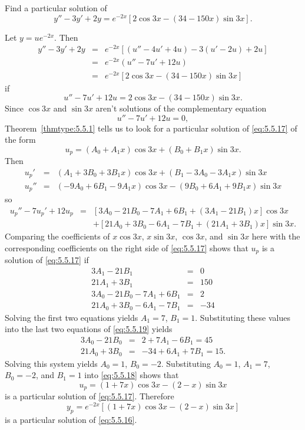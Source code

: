 \documentclass{ximera}
\begin{document}
\begin{example}\label{example:5.5.5}
Find a particular solution of
\begin{equation} \label{eq:5.5.16}
y''-3y'+2y=e^{-2x}\left[2\cos 3x-(34-150x)\sin 3x\right].
\end{equation}


\begin{explanation}
Let $y=ue^{-2x}$. Then
\begin{eqnarray*}
y''-3y'+2y&=&e^{-2x}\left[(u''-4u'+4u)-3(u'-2u)+2u\right]\\
&=&e^{-2x}(u''-7u'+12u)\\ &=&
e^{-2x}\left[2\cos 3x-(34-150x)\sin 3x\right]
\end{eqnarray*}
if
 \begin{equation} \label{eq:5.5.17}
u''-7u'+12u=2\cos 3x-(34-150x)\sin 3x.
\end{equation}
Since $\cos3x$ and $\sin3x$ aren't solutions of
the complementary equation
$$
u''-7u'+12u=0,
$$
 Theorem~\ref{thmtype:5.5.1} tells us to look for a particular solution
of \eqref{eq:5.5.17} of the form
\begin{equation} \label{eq:5.5.18}
u_p=(A_0+A_1x)\cos 3x +(B_0+B_1x)\sin 3x.
\end{equation}
Then
\begin{eqnarray*}
u_p'&=&(A_1+3B_0+3B_1x)\cos 3x+(B_1-3A_0-3A_1x)\sin 3x\\
u_p''&=&(-9A_0+6B_1-9A_1x)\cos 3x-(9B_0+6A_1+9B_1x)\sin 3x
\end{eqnarray*}
so
\begin{eqnarray*}
u_p''-7u_p'+12u_p&=&\left[3A_0-21B_0-7A_1+6B_1+(3A_1-21B_1)x\right]\cos
3x\\ &&+\left[21A_0+3B_0-6A_1-7B_1+(21A_1+3B_1)x\right]\sin 3x.
\end{eqnarray*}
Comparing the coefficients of $x\cos 3x$, $x\sin 3x$, $\cos 3x$, and
$\sin 3x$ here with the corresponding coefficients on the right side
of \eqref{eq:5.5.17} shows that $u_p$ is a solution of \eqref{eq:5.5.17} if
\begin{equation} \label{eq:5.5.19}
\begin{array}{rcr}
3A_1-21B_1&=&0\\
21A_1+3B_1&=&150\\
3A_0-21B_0-7A_1+6B_1&=&2\\
21A_0+3B_0-6A_1-7B_1&=&-34
\end{array}
\end{equation}
Solving the first two equations yields $A_1=7$, $B_1=1$.
Substituting these values into the last two equations of \eqref{eq:5.5.19}
yields
\begin{eqnarray*}
3A_0-21B_0&=&2+7A_1-6B_1=45\\
21A_0+3B_0&=&-34+6A_1+7B_1=15.
\end{eqnarray*}
Solving this system  yields  $A_0=1$, $B_0=-2$.
Substituting $A_0=1$, $A_1=7$, $B_0=-2$, and $B_1=1$ into
\eqref{eq:5.5.18} shows that
$$
u_p=(1+7x)\cos 3x-(2-x)\sin 3x
$$
is a particular solution of  \eqref{eq:5.5.17}. Therefore
$$
y_p=e^{-2x}\left[(1+7x)\cos 3x-(2-x)\sin 3x\right]
$$
is a particular solution of   \eqref{eq:5.5.16}.
\end{explanation}
\end{example}
\end{document}

